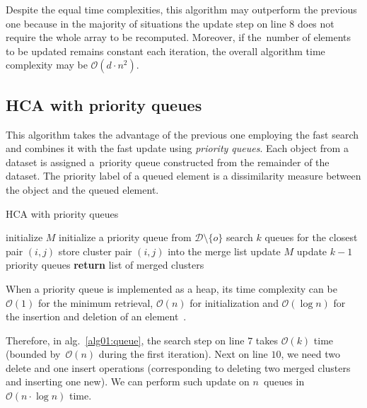 Despite the equal time complexities, this algorithm may outperform the previous one because in the majority of situations the update step on line $8$ does not require the whole array to be recomputed. Moreover, if the~number of elements to be updated remains constant each iteration, the overall algorithm time complexity may be $\mathcal{O}(d\cdot n^2)$. 

\subsection{HCA with priority queues}

This algorithm takes the advantage of the previous one employing the fast search and combines it with the fast update using \emph{priority queues}.
Each object from a dataset is assigned a~priority queue constructed from the remainder of the dataset. The priority label of a queued element is a dissimilarity measure between the object and the queued element. 

\begin{algorithm}[t]
 	\caption{HCA with priority queues}
 	\label{alg01:queue}
 	\begin{algorithmic}[1]
 		\State initialize $M$ 
 		\State initialize a priority queue from $\mathcal{D} \setminus \{o\}$ 
 		\EndFor
 		\State search $k$ queues for the closest pair $(i,j)$ 
 		\State store cluster pair $(i,j)$ into the merge list 
 		\State update $M$ 
 		\State update $k-1$ priority queues 
 		\EndFor
 		\State \textbf{return} list of merged clusters
 		\EndProcedure
 	\end{algorithmic}
\end{algorithm}

When a priority queue is implemented as a heap, its time complexity can be $\mathcal{O}(1)$ for the minimum retrieval, $\mathcal{O}(n)$ for initialization and $\mathcal{O}(\log n)$ for the insertion and deletion of an element~\cite{fredman1987fibonacci}.

Therefore, in alg.~\ref{alg01:queue}, the search step on line $7$ takes $\mathcal{O}(k)$ time (bounded by~$\mathcal{O}(n)$ during the first iteration). Next on line $10$, we need two delete and one insert operations (corresponding to deleting two merged clusters and inserting one new). We can perform such update on $n$~queues in $\mathcal{O}(n\cdot\log{n})$ time.

